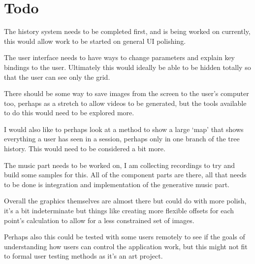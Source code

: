 \documentclass[10pt,a4paper]{article}
\begin{document}
\section{Todo}
The history system needs to be completed first, and is being worked on
currently, this would allow work to be started on general UI polishing.

The user interface needs to have ways to change parameters and explain key
bindings to the user. Ultimately this would ideally be able to be hidden totally
so that the user can see only the grid.

There should be some way to save images from the screen to the user's computer
too, perhaps as a stretch to allow videos to be generated, but the tools
available to do this would need to be explored more. 

I would also like to perhaps look at a method to show a large `map' that shows
everything a user has seen in a session, perhaps only in one branch of the tree
history. This would need to be considered a bit more.

The music part needs to be worked on, I am collecting recordings to try and
build some samples for this. All of the component parts are there, all that
needs to be done is integration and implementation of the generative music part.

Overall the graphics themselves are almost there but could do with more polish,
it's a bit indeterminate but things like creating more flexible offsets for each
point's calculation to allow for a less constrained set of images. 

Perhaps also this could be tested with some users remotely to see if the goals
of understanding how users can control the application work, but this might not
fit to formal user testing methods as it's an art project.
\end{document}
